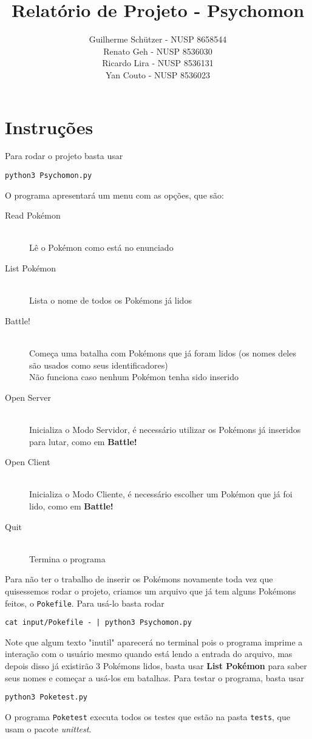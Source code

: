 \documentclass[a4paper]{article}
\title{Relatório de Projeto - Psychomon}
\author{
Guilherme Schützer - NUSP 8658544 \\
Renato Geh         - NUSP 8536030 \\
Ricardo Lira       - NUSP 8536131 \\
Yan Couto          - NUSP 8536023
}
\date{}
\begin{document}
\maketitle

\section*{Instruções}
Para rodar o projeto basta usar
\begin{center}
\texttt{python3 Psychomon.py}
\end{center}
O programa apresentará um menu com as opções, que são:
\begin{description}
\item[Read Pokémon] \hfill \\ Lê o Pokémon como está no enunciado
\item[List Pokémon] \hfill \\ Lista o nome de todos os Pokémons já lidos
\item[Battle!] \hfill \\ Começa uma batalha com Pokémons que já foram lidos
(os nomes deles são usados como seus identificadores) \\ Não funciona caso
nenhum Pokémon tenha sido inserido
\item[Open Server] \hfill \\ Inicializa o Modo Servidor, é necessário utilizar
os Pokémons já inseridos para lutar, como em \textbf{Battle!}
\item[Open Client] \hfill \\ Inicializa o Modo Cliente, é necessário escolher um
Pokémon que já foi lido, como em \textbf{Battle!}
\item[Quit] \hfill \\ Termina o programa
\end{description}
Para não ter o trabalho de inserir os Pokémons novamente toda vez que quisessemos
rodar o projeto, criamos um arquivo que já tem alguns Pokémons feitos, o \texttt{Pokefile}.
Para usá-lo basta rodar
\begin{center}
\texttt{cat input/Pokefile - | python3 Psychomon.py}
\end{center}
Note que algum texto "inutil" aparecerá no terminal pois o programa imprime a
interação com o usuário mesmo quando está lendo a entrada do arquivo, mas depois
disso já existirão 3 Pokémons lidos, basta usar \textbf{List Pokémon} para saber
seus nomes e começar a usá-los em batalhas.
\newpage
Para testar o programa, basta usar
\begin{center}
\texttt{python3 Poketest.py}
\end{center}
O programa \texttt{Poketest} executa todos os testes que estão na pasta \texttt{tests},
que usam o pacote \emph{unittest}.
\end{document}
